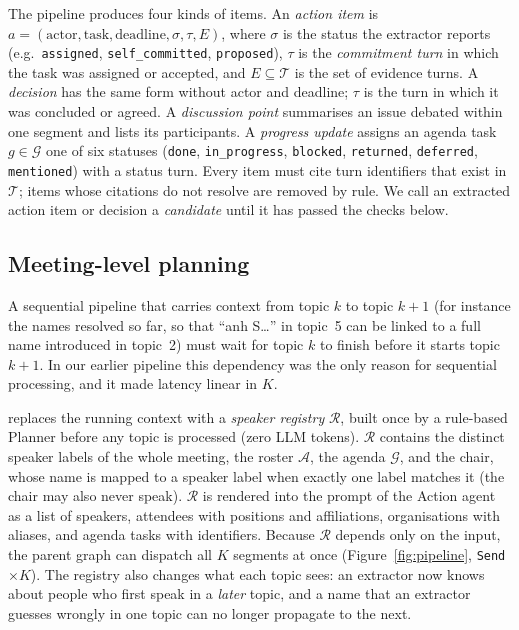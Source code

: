 The pipeline produces four kinds of items.
An \emph{action item} is $a=(\text{actor}, \text{task}, \text{deadline}, \sigma, \tau, E)$, where $\sigma$ is the status the extractor reports (e.g.\ \texttt{assigned}, \texttt{self\_committed}, \texttt{proposed}), $\tau$ is the \emph{commitment turn} in which the task was assigned or accepted, and $E\subseteq\mathcal{T}$ is the set of evidence turns.
A \emph{decision} has the same form without actor and deadline; $\tau$ is the turn in which it was concluded or agreed.
A \emph{discussion point} summarises an issue debated within one segment and lists its participants.
A \emph{progress update} assigns an agenda task $g\in\mathcal{G}$ one of six statuses (\texttt{done}, \texttt{in\_progress}, \texttt{blocked}, \texttt{returned}, \texttt{deferred}, \texttt{mentioned}) with a status turn.
Every item must cite turn identifiers that exist in $\mathcal{T}$; items whose citations do not resolve are removed by rule.
We call an extracted action item or decision a \emph{candidate} until it has passed the checks below.

\subsection{Meeting-level planning}
\label{sec:method:planner}

A sequential pipeline that carries context from topic $k$ to topic $k{+}1$ (for instance the names resolved so far, so that ``anh S\ldots'' in topic~5 can be linked to a full name introduced in topic~2) must wait for topic $k$ to finish before it starts topic $k{+}1$.
In our earlier pipeline this dependency was the only reason for sequential processing, and it made latency linear in $K$.

\method{} replaces the running context with a \emph{speaker registry} $\mathcal{R}$, built once by a rule-based Planner before any topic is processed (zero LLM tokens).
$\mathcal{R}$ contains the distinct speaker labels of the whole meeting, the roster $\mathcal{A}$, the agenda $\mathcal{G}$, and the chair, whose name is mapped to a speaker label when exactly one label matches it (the chair may also never speak).
$\mathcal{R}$ is rendered into the prompt of the Action agent as a list of speakers, attendees with positions and affiliations, organisations with aliases, and agenda tasks with identifiers.
Because $\mathcal{R}$ depends only on the input, the parent graph can dispatch all $K$ segments at once (Figure~\ref{fig:pipeline}, \texttt{Send}$\times K$).
The registry also changes what each topic sees: an extractor now knows about people who first speak in a \emph{later} topic, and a name that an extractor guesses wrongly in one topic can no longer propagate to the next.

